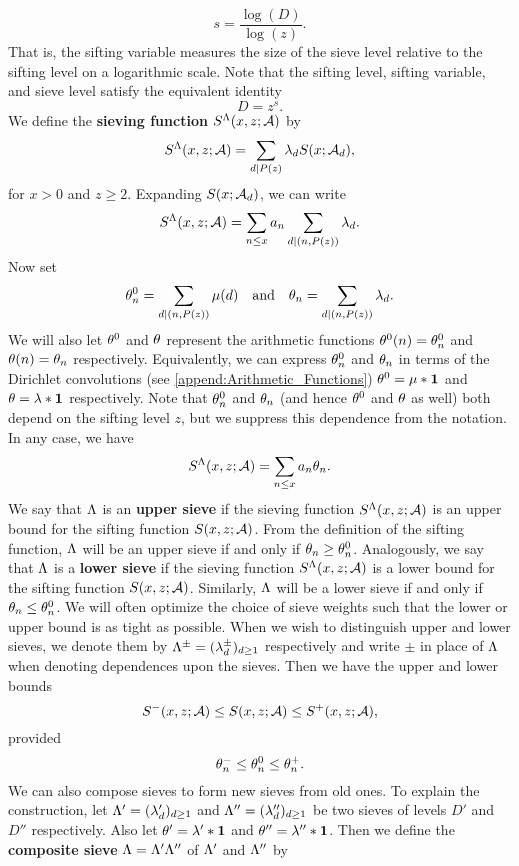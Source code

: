 \documentclass[12pt,oneside]{book}
\begin{document}
    \[
      s = \frac{\log(D)}{\log(z)}.
    \]
    That is, the sifting variable measures the size of the sieve level relative to the sifting level on a logarithmic scale. Note that the sifting level, sifting variable, and sieve level satisfy the equivalent identity
    \[
      D = z^{s}.
    \]
    We define the \textbf{sieving function} $S^{\Lambda}(x,z;\mathcal{A})$ by
    \[
      S^{\Lambda}(x,z;\mathcal{A}) = \sum_{d \mid P(z)}\lambda_{d}S(x;\mathcal{A}_{d}),
    \]
    for $x > 0$ and $z \ge 2$. Expanding $S(x;\mathcal{A}_{d})$, we can write
    \[
      S^{\Lambda}(x,z;\mathcal{A}) = \sum_{n \le x}a_{n}\sum_{d \mid (n,P(z))}\lambda_{d}.
    \]
    Now set
    \[
      \theta_{n}^{0} = \sum_{d \mid (n,P(z))}\mu(d) \quad \text{and} \quad \theta_{n} = \sum_{d \mid (n,P(z))}\lambda_{d}.
    \]
    We will also let $\theta^{0}$ and $\theta$ represent the arithmetic functions $\theta^{0}(n) = \theta_{n}^{0}$ and $\theta(n) = \theta_{n}$ respectively. Equivalently, we can express $\theta_{n}^{0}$ and $\theta_{n}$ in terms of the Dirichlet convolutions (see \cref{append:Arithmetic_Functions}) $\theta^{0} = \mu \ast \mathbf{1}$ and $\theta = \lambda \ast \mathbf{1}$ respectively. Note that $\theta_{n}^{0}$ and $\theta_{n}$ (and hence $\theta^{0}$ and $\theta$ as well) both depend on the sifting level $z$, but we suppress this dependence from the notation. In any case, we have
    \[
      S^{\Lambda}(x,z;\mathcal{A}) = \sum_{n \le x}a_{n}\theta_{n}. 
    \]
    We say that $\Lambda$ is an \textbf{upper sieve} if the sieving function $S^{\Lambda}(x,z;\mathcal{A})$ is an upper bound for the sifting function $S(x,z;\mathcal{A})$. From the definition of the sifting function, $\Lambda$ will be an upper sieve if and only if $\theta_{n} \ge \theta_{n}^{0}$. Analogously, we say that $\Lambda$ is a \textbf{lower sieve} if the sieving function $S^{\Lambda}(x,z;\mathcal{A})$ is a lower bound for the sifting function $S(x,z;\mathcal{A})$. Similarly, $\Lambda$ will be a lower sieve if and only if $\theta_{n} \le \theta_{n}^{0}$. We will often optimize the choice of sieve weights such that the lower or upper bound is as tight as possible. When we wish to distinguish upper and lower sieves, we denote them by $\Lambda^{\pm} = (\lambda_{d}^{\pm})_{d \ge 1}$ respectively and write $\pm$ in place of $\Lambda$ when denoting dependences upon the sieves. Then we have the upper and lower bounds
    \[
      S^{-}(x,z;\mathcal{A}) \le S(x,z;\mathcal{A}) \le S^{+}(x,z;\mathcal{A}),
    \]
    provided
    \begin{equation}\label{equ:upper_lower_sieve_theta_relation}
      \theta_{n}^{-} \le \theta_{n}^{0} \le \theta_{n}^{+}.
    \end{equation}
    We can also compose sieves to form new sieves from old ones. To explain the construction, let $\Lambda' = (\lambda'_{d})_{d \ge 1}$ and $\Lambda'' = (\lambda''_{d})_{d \ge 1}$ be two sieves of levels $D'$ and $D''$ respectively. Also let $\theta' = \lambda' \ast \mathbf{1}$ and $\theta'' = \lambda'' \ast \mathbf{1}$. Then we define the \textbf{composite sieve} $\Lambda = \Lambda'\Lambda''$ of $\Lambda'$ and $\Lambda''$ by
\end{document}
